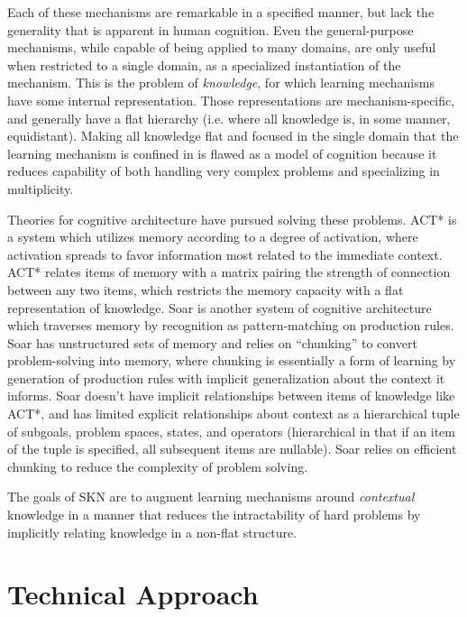 \documentclass[11pt,letterpaper]{article}
\begin{document}
Each of these mechanisms are remarkable in a specified manner, but lack the
generality that is apparent in human cognition. Even the general-purpose
mechanisms, while capable of being applied to many domains, are only useful
when restricted to a single domain, as a specialized instantiation of the
mechanism. This is the problem of \emph{knowledge}, for which learning
mechanisms have some internal representation. Those representations are
mechanism-specific, and generally have a flat hierarchy (i.e. where all
knowledge is, in some manner, equidistant). Making all knowledge flat and
focused in the single domain that the learning mechanism is confined in is
flawed as a model of cognition because it reduces capability of both
handling very complex problems and specializing in multiplicity.

Theories for cognitive architecture have pursued solving these problems.
ACT* \cite{anderson83} is a system which utilizes memory according to a
degree of activation, where activation spreads to favor information most
related to the immediate context. ACT* relates items of memory with a matrix
pairing the strength of connection between any two items, which restricts
the memory capacity with a flat representation of knowledge. Soar
\cite{newell94} is another system of cognitive architecture which traverses
memory by recognition as pattern-matching on production rules. Soar has
unstructured sets of memory and relies on ``chunking'' to convert
problem-solving into memory, where chunking is essentially a form of
learning by generation of production rules with implicit generalization
about the context it informs. Soar doesn't have implicit relationships
between items of knowledge like ACT*, and has limited explicit relationships
about context as a hierarchical tuple of subgoals, problem spaces, states, and
operators (hierarchical in that if an item of the tuple is specified, all
subsequent items are nullable). Soar relies on efficient chunking to reduce
the complexity of problem solving.

The goals of SKN are to augment learning mechanisms around \emph{contextual}
knowledge in a manner that reduces the intractability of hard problems by
implicitly relating knowledge in a non-flat structure.


\section{Technical Approach}
\end{document}

